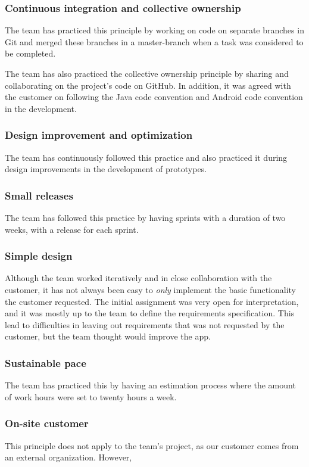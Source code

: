 \subsubsection{Continuous integration and collective ownership}
The team has practiced this principle by working on code on separate branches in Git and merged these branches in a master-branch when a task was considered to be completed.

The team has also practiced the collective ownership principle by sharing and collaborating on the project's code on GitHub. In addition, it was agreed with the customer on following the Java code convention and Android code convention in the development.

\subsubsection{Design improvement and optimization}
The team has continuously followed this practice and also practiced it during design improvements in the development of prototypes.
 
\subsubsection{Small releases}
The team has followed this practice by having sprints with a duration of two weeks, with a release for each sprint.


\subsubsection{Simple design}
Although the team worked iteratively and in close collaboration with the customer, it has not always been easy to \emph{only} implement the basic functionality the customer requested. The initial assignment was very open for interpretation, and it was mostly up to the team to define the requirements specification. This lead to difficulties in leaving out requirements that was not requested by the customer, but the team thought would improve the app.

\subsubsection{Sustainable pace}
The team has practiced this by having an estimation process where the amount of work hours were set to twenty hours a week.

\subsubsection{On-site customer}
This principle does not apply to the team's project, as our customer comes from an external organization. However,

